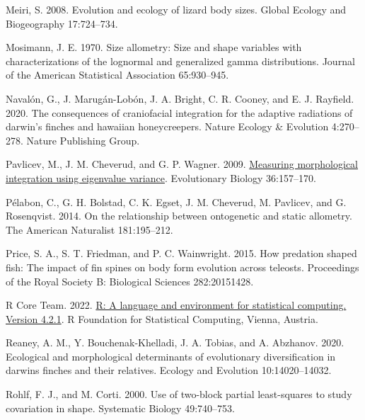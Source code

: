 \documentclass[
  11pt,
]{article}
\newlength{\cslhangindent}
\newlength{\cslentryspacingunit} %
\newenvironment{CSLReferences}[2] %
 {%
  \setlength{\parindent}{0pt}
  \ifodd #1
  \let\oldpar\par
  \def\par{\hangindent=\cslhangindent\oldpar}
  \fi
  \setlength{\parskip}{#2\cslentryspacingunit}
 }%
 {}
\begin{document}
\begin{CSLReferences}{1}{0}
\leavevmode{}%
Meiri, S. 2008. Evolution and ecology of lizard body sizes. Global
Ecology and Biogeography 17:724--734.

\leavevmode{}%
Mosimann, J. E. 1970. Size allometry: Size and shape variables with
characterizations of the lognormal and generalized gamma distributions.
Journal of the American Statistical Association 65:930--945.

\leavevmode{}%
Navalón, G., J. Marugán-Lobón, J. A. Bright, C. R. Cooney, and E. J.
Rayfield. 2020. The consequences of craniofacial integration for the
adaptive radiations of darwin's finches and hawaiian honeycreepers.
Nature Ecology \& Evolution 4:270--278. Nature Publishing Group.

\leavevmode{}%
Pavlicev, M., J. M. Cheverud, and G. P. Wagner. 2009.
\href{https://doi.org/10.1007/s11692-008-9042-7}{Measuring morphological
integration using eigenvalue variance}. Evolutionary Biology
36:157--170.

\leavevmode{}%
Pélabon, C., G. H. Bolstad, C. K. Egset, J. M. Cheverud, M. Pavlicev,
and G. Rosenqvist. 2014. On the relationship between ontogenetic and
static allometry. The American Naturalist 181:195--212.

\leavevmode{}%
Price, S. A., S. T. Friedman, and P. C. Wainwright. 2015. How predation
shaped fish: The impact of fin spines on body form evolution across
teleosts. Proceedings of the Royal Society B: Biological Sciences
282:20151428.

\leavevmode{}%
R Core Team. 2022. \href{https://www.R-project.org/}{R: A language and
environment for statistical computing. Version 4.2.1}. R Foundation for
Statistical Computing, Vienna, Austria.

\leavevmode{}%
Reaney, A. M., Y. Bouchenak-Khelladi, J. A. Tobias, and A. Abzhanov.
2020. Ecological and morphological determinants of evolutionary
diversification in darwin{\textquotesingle}s finches and their
relatives. Ecology and Evolution 10:14020--14032.

\leavevmode{}%
Rohlf, F. J., and M. Corti. 2000. Use of two-block partial least-squares
to study covariation in shape. Systematic Biology 49:740--753.


\end{CSLReferences}
\end{document}
